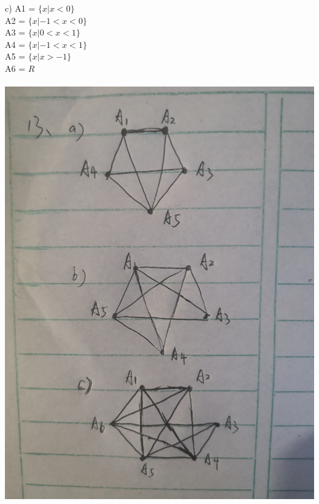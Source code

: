 \documentclass[UTF8]{article}
\begin{document}
\begin{description}
            c) A1 = $\{x | x < 0\}$    \\
               A2 = $\{x | −1 <x< 0\}$ \\
               A3 = $\{x | 0 <x< 1\}$  \\
               A4 = $\{x | −1 <x< 1\}$ \\
               A5 = $\{x | x > −1\}$   \\
               A6 = $R$               \\
            \\ \includegraphics[scale=0.1]{../imgs/10_1_13.jpg}  \\ 

\end{description}
\end{document}
